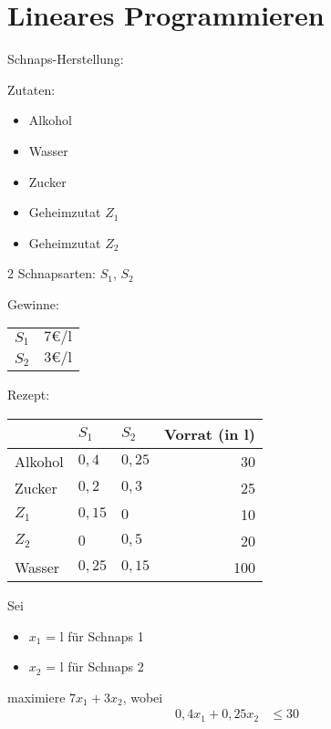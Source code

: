 \section{Lineares Programmieren}
Schnaps-Herstellung:
\begin{description}
 \item Zutaten:
     \begin{itemize}
      \item Alkohol
      \item Wasser
      \item Zucker
      \item Geheimzutat $Z_1$
      \item Geheimzutat $Z_2$
     \end{itemize}
 \item 2 Schnapsarten: $S_1$, $S_2$
 \item Gewinne:
     \begin{center}
     \begin{tabular}{ll}
      $S_1$ & $7 \euro/\text{l}$ \\
      $S_2$ & $3 \euro/\text{l}$
     \end{tabular}
     \end{center}
 \item Rezept:
     \begin{center}
        \begin{tabular}{l|ll|r}
                    & $S_1$    & $S_2$    & Vorrat (in l)\\\hline
            Alkohol & $0{,}4$  & $0{,}25$ &  30\\
            Zucker  & $0{,}2$  & $0{,}3$  &  25\\
            $Z_1$   & $0{,}15$ & $0$      &  10\\
            $Z_2$   & $0$      & $0{,}5$  &  20\\
            Wasser  & $0{,}25$ & $0{,}15$ & 100\\\hline
        \end{tabular}
     \end{center}
 \item Sei
     \begin{itemize}
      \item $x_1$ = l für Schnaps 1
      \item $x_2$ = l für Schnaps 2
     \end{itemize}
 \item[Ziel:] maximiere $7x_1 + 3x_2$, wobei
        \begin{align*}
            0{,}4 x_1 + 0{,}25 x_2 &\leq 30 \tag{1} \\

\end{align*}
\end{description}
